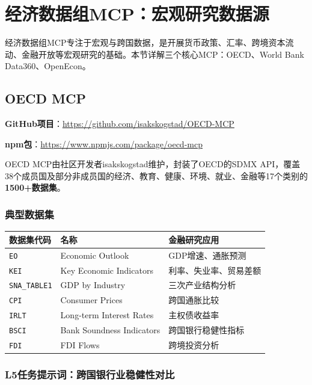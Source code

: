 \section{经济数据组MCP：宏观研究数据源}

经济数据组MCP专注于宏观与跨国数据，是开展货币政策、汇率、跨境资本流动、金融开放等宏观研究的基础。本节详解三个核心MCP：OECD、World Bank Data360、OpenEcon。

\subsection{OECD MCP}

\textbf{GitHub项目}：\url{https://github.com/isakskogstad/OECD-MCP}

\textbf{npm包}：\url{https://www.npmjs.com/package/oecd-mcp}

OECD MCP由社区开发者isakskogstad维护，封装了OECD的SDMX API，覆盖38个成员国及部分非成员国的经济、教育、健康、环境、就业、金融等17个类别的\textbf{1500+数据集}。

\subsubsection{典型数据集}

\begin{table}[H]
\centering
\small
\begin{tabular}{lll}
\toprule
\textbf{数据集代码} & \textbf{名称} & \textbf{金融研究应用} \\
\midrule
\texttt{EO} & Economic Outlook & GDP增速、通胀预测 \\
\texttt{KEI} & Key Economic Indicators & 利率、失业率、贸易差额 \\
\texttt{SNA\_TABLE1} & GDP by Industry & 三次产业结构分析 \\
\texttt{CPI} & Consumer Prices & 跨国通胀比较 \\
\texttt{IRLT} & Long-term Interest Rates & 主权债收益率 \\
\texttt{BSCI} & Bank Soundness Indicators & 跨国银行稳健性指标 \\
\texttt{FDI} & FDI Flows & 跨境投资分析 \\
\bottomrule
\end{tabular}
\end{table}

\subsubsection{L5任务提示词：跨国银行业稳健性对比}

